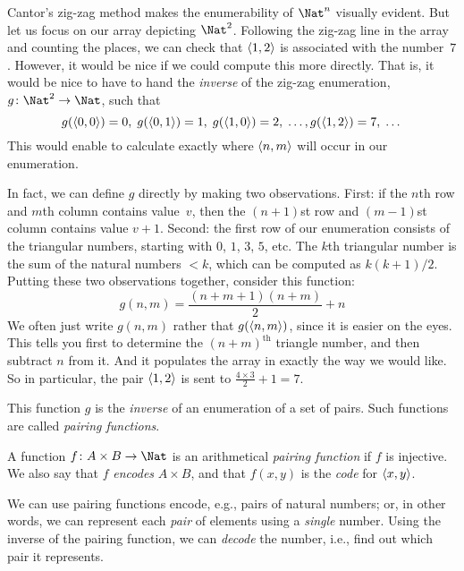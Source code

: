 \documentclass[../../../include/open-logic-section]{subfiles}
\begin{document}

\begin{explain}
Cantor's zig-zag method makes the enumerability of $\Nat^n$ visually
evident. But let us focus on our array depicting $\Nat^2$. Following
the zig-zag line in the array and counting the places, we can check
that $\langle 1,2 \rangle$ is associated with the number~$7$. However, it would
be nice if we could compute this more directly. That is, it would be
nice to have to hand the \emph{inverse} of the zig-zag enumeration,
$g\colon \Nat^2 \to \Nat$, such that
\[
g(\langle 0,0 \rangle) = 0, \;
g(\langle 0,1 \rangle) = 1, \;
g(\langle 1,0 \rangle) = 2, \; \dots,  
g(\langle 1,2 \rangle) = 7, \; \dots
\]
This would enable to calculate exactly where $\langle n, m \rangle$ will occur
in our enumeration. 

In fact, we can define $g$ directly by making two observations. First:
if the $n$th row and $m$th column contains value~$v$, then the
$(n+1)$st row and $(m-1)$st column contains value $v + 1$. Second: the
first row of our enumeration consists of the triangular numbers,
starting with $0$, $1$, $3$, $5$, etc. The $k$th triangular number is
the sum of the natural numbers $< k$, which can be computed as
$k(k+1)/2$. Putting these two observations together, consider this
function:
\[
  g(n,m) = \frac{(n+m+1)(n+m)}{2} + n
\]
We often just write $g(n, m)$ rather that $g(\langle n, m \rangle)$, since it
is easier on the eyes. This tells you first to determine the
$(n+m)^\text{th}$ triangle number, and then subtract $n$ from it. And
it populates the array in exactly the way we would like. So in
particular, the pair $\langle 1, 2 \rangle$ is sent to $\frac{4 \times 3}{2} +
1 = 7$. 

This function $g$ is the \emph{inverse} of an enumeration of a set of
pairs. Such functions are called \emph{pairing functions}.
\end{explain}

\begin{defn} 
  A function $f\colon A \times B \to \Nat$ is an arithmetical
  \emph{pairing function} if $f$ is injective. We also say that $f$
  \emph{encodes} $A \times B$, and that $f(x,y)$ is the
  \emph{code} for $\langle x,y \rangle$.
\end{defn}

\begin{explain}
We can use pairing functions encode, e.g., pairs of natural numbers;
or, in other words, we can represent each \emph{pair} of elements
using a \emph{single} number. Using the inverse of the pairing
function, we can \emph{decode} the number, i.e., find out which
pair it represents.
\end{explain}
\end{document}
